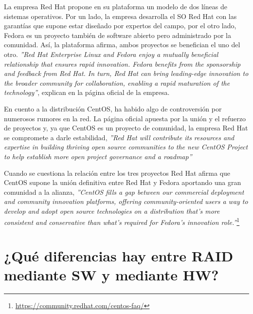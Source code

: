 La empresa Red Hat propone en su plataforma\cite{redhat} un modelo de dos líneas de sistemas operativos. Por un lado, la empresa desarrolla el SO Red Hat con las garantías que
supone estar diseñado por expertos del campo, por el otro lado, Fedora es un proyecto también de software abierto pero administrado por la comunidad. Así, la plataforma afirma,
ambos proyectos se benefician el uno del otro.
\textit{''Red Hat Enterprise Linux and Fedora enjoy a mutually beneficial relationship that ensures rapid innovation. Fedora benefits from the sponsorship and feedback from Red Hat. In turn, Red Hat can bring leading-edge innovation to the broader community for collaboration, enabling a rapid maturation of the technology''}, explican en la página oficial de la empresa.

\vspace{8mm}

En cuento a la distribución  CentOS, ha habido algo de controversión por numerosos rumores en la red. La página oficial apuesta por la unión y el refuerzo de proyectos y, ya que
 CentOS es un proyecto de comunidad, la empresa Red Hat se compromete a darle estabilidad,
\textit{''Red Hat will contribute its resources and expertise in building thriving open source communities to the new CentOS Project to help establish more open project governance and a roadmap''}

\vspace{8mm}

Cuando se cuestiona la relación entre los tres proyectos Red Hat afirma que CentOS supone la unión definitiva entre Red Hat y Fedora aportando una gran comunidad a la alianza,
\textit{''CentOS fills a gap between our commercial deployment and community innovation platforms, offering community-oriented users a way to develop and adopt open source technologies on a distribution that’s more consistent and conservative than what’s required for Fedora’s innovation role.''}\footnote{\url{https://community.redhat.com/centos-faq/}}







\section{¿Qué diferencias hay entre RAID mediante SW y mediante HW?}

